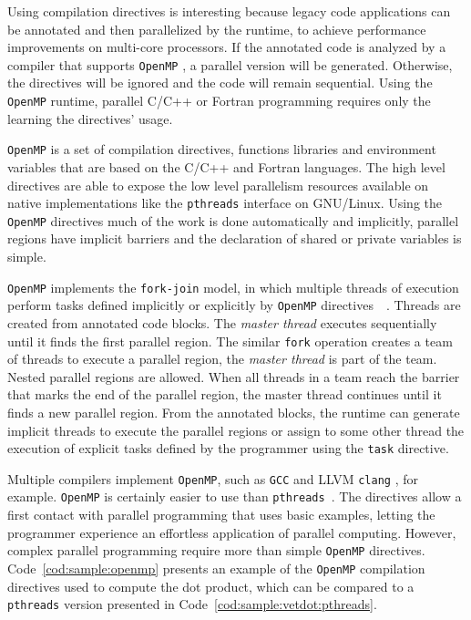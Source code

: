Using compilation directives is interesting because legacy code applications can be annotated and then parallelized by the runtime, to achieve performance improvements on multi-core processors. If the annotated code is analyzed by a compiler that supports \texttt{OpenMP} \cite{Dagum1998a} \cite{openmp:api:2011} \cite{openmp:api:2013} \cite{Chapman:2007} \cite{openmp:site}, a parallel version will be generated. Otherwise, the directives will be ignored and the code will remain sequential. Using the \texttt{OpenMP} runtime, parallel C/C++ or Fortran programming requires only the learning the directives' usage.

\texttt{OpenMP} is a set of compilation directives, functions libraries and environment variables that are based on the C/C++ and Fortran languages. The high level directives are able to expose the low level parallelism resources available on native implementations like the \texttt{pthreads} interface on GNU/Linux. Using the \texttt{OpenMP} directives much of the work is done automatically and implicitly, parallel regions have implicit barriers and the declaration of shared or private variables is simple.

\texttt{OpenMP} implements the \texttt{fork-join} model, in which multiple threads of execution perform tasks defined implicitly or explicitly by \texttt{OpenMP} directives~\cite{openmp:api:2011}~\cite{openmp:api:2013}. Threads are created from annotated code blocks. The \textit{master thread} executes sequentially until it finds the first parallel region. The similar \texttt{fork} operation creates a team of threads to execute a parallel region, the \textit{master thread} is part of the team. Nested parallel regions are allowed. When all threads in a team reach the barrier that marks the end of the parallel region, the master thread continues until it finds a new parallel region. From the annotated blocks, the runtime can generate implicit threads to execute the parallel regions or assign to some other thread the execution of explicit tasks defined by the programmer using the \texttt{task} directive.

Multiple compilers implement \texttt{OpenMP}, such as \texttt{GCC} \cite{libgomp:2015} and LLVM \texttt{clang} \cite{LLVM:CGO04} \cite{clang:site} \cite{openmp:llvm:site}, for example. \texttt{OpenMP} is certainly easier to use than \texttt{pthreads}~\cite{CPE:CPE529}. The directives allow a first contact with parallel programming that uses basic examples, letting the programmer experience an effortless application of parallel computing. However, complex parallel programming require more than simple \texttt{OpenMP} directives. Code~\ref{cod:sample:openmp} presents an example of the \texttt{OpenMP} compilation directives used to compute the dot product, which can be compared to a \texttt{pthreads} version presented in Code~\ref{cod:sample:vetdot:pthreads}.

